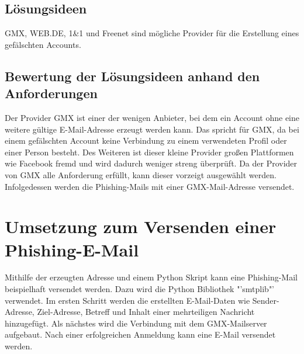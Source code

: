 	\subsection{Lösungsideen}
	GMX, WEB.DE, 1\&1 und Freenet sind mögliche Provider für die Erstellung eines gefälschten Accounts.
	\subsection{Bewertung der Lösungsideen anhand den Anforderungen}
 	Der Provider GMX ist einer der wenigen Anbieter, bei dem ein Account ohne eine weitere gültige E-Mail-Adresse erzeugt werden kann. Das spricht für GMX, da bei einem gefälschten Account keine Verbindung zu einem verwendeten Profil oder einer Person besteht. Des Weiteren ist dieser kleine Provider großen Plattformen wie Facebook fremd und wird dadurch weniger streng überprüft. Da der Provider von GMX alle Anforderung erfüllt, kann dieser vorzeigt ausgewählt werden. Infolgedessen werden die Phishing-Mails mit einer GMX-Mail-Adresse versendet. \cite{Bazzell}
\section{Umsetzung zum Versenden einer Phishing-E-Mail}
Mithilfe der erzeugten Adresse und einem Python Skript kann eine Phishing-Mail beispielhaft versendet werden. Dazu wird die Python Bibliothek "'smtplib"' verwendet. Im ersten Schritt werden die erstellten E-Mail-Daten wie Sender-Adresse, Ziel-Adresse, Betreff und Inhalt einer mehrteiligen Nachricht hinzugefügt. Als nächstes wird die Verbindung mit dem GMX-Mailserver aufgebaut. Nach einer erfolgreichen Anmeldung kann eine E-Mail versendet werden. 










	
